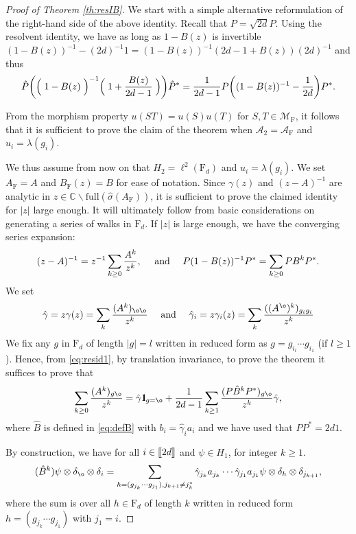 \documentclass[11pt]{article}
\renewcommand{\star}{{\mathrm{F}}}
\newcommand{\cA}{\mathcal{A}}
\newcommand{\dF}{\mathrm{F}}
\newcommand{\dC}{\mathbb {C}}
\newcommand{\cM}{\mathcal {M}}
\newcommand{\FULL}{ \mathrm{full}}
\newcommand{\PAR}[1]{{{\left(#1\right)}}} %
\newcommand{\1}{1\!\!{\sf I}}
\newcommand{\IND}{\1}
\newcommand{\INT}[1]{{{\left[\hspace{-1.4pt}\left[#1\right]\hspace{-1.4pt}\right]}}}
\begin{document}
\begin{proof}[Proof of Theorem \ref{th:resIB}]
We start with a simple alternative reformulation of the right-hand side of the above identity. Recall that $P = \sqrt {2d} \hat P$.  Using the resolvent identity, we have as long as $1 -B(z)$ is invertible
$(1 -B(z) )^{-1}  - (2d)^{-1} 1 = (1 - B(z) )^{-1} ( 2d - 1 + B(z) ) (2d)^{-1}$ and thus
\begin{equation}\label{eq:resid1}
\hat P \PAR{ \Bigm(1 - B(z) \Bigm)^{-1} \Bigm(  1 + \frac{B(z)}{2d-1} \Bigm) }  \hat P^*   = \frac{1}{2d-1} P \PAR{ (1 - B(z) )^{-1} - \frac{1}{2d}  }  P^*.
\end{equation}


From the morphism property $u ( S T) = u(S) u(T)$ for $S, T \in \cM_\star$, it follows that it is sufficient to prove the claim of the theorem when $\cA_2 = \cA_\star$ and $u_i = \lambda(g_i)$.

We thus assume from now on that $H_2 = \ell^2 (\dF_d)$ and $u_i = \lambda(g_i)$. We set $A_\star = A$ and $B_\star (z)= B$ for ease of notation. Since $\gamma(z)$ and $(z- A)^{-1}$ are analytic in $z \in \dC \backslash \FULL(\hat \sigma(A_\star))$, it is sufficient to prove the claimed identity for $|z|$ large enough. It will ultimately follow from basic considerations on generating a series of walks in $\dF_d$. If $|z|$ is large enough,  we have the converging series expansion:
$$
(z - A) ^{-1} = z^{-1} \sum_{k\geq 0} \frac{A^k}{z^k}, \quad  \hbox{ and } \quad   P(1 - B(z)) ^{-1} P^* =   \sum_{k \geq 0} P B^k P^*.
$$
We set  $$\hat \gamma = z \gamma(z) = \sum_k \frac{(A^k)_{\o \o}}{z^k} \quad  \hbox{ and } \quad  \hat \gamma_i  =  z \gamma_i (z) =   \sum_k \frac{((A^{\o})^k)_{g_i g_i}}{z^k} $$  
We fix any $g$ in $\dF_d$ of length $|g| = l$ written in reduced form as  $g= g_{i_l} \cdots g_{i_1}$ (if $l \geq 1$). Hence, from \eqref{eq:resid1}, by translation invariance, to prove the theorem it suffices to prove that 
\begin{equation}\label{eq:formula1}
\sum_{k\geq 0} \frac{(A^k)_{ g \o} }{z^k} = \hat \gamma \IND_{g = \o} + \frac{1}{2d-1}\sum_{k\geq 1}  \frac{(P \hat B^k P^*) _{g \o}}{z^k}  \hat \gamma,
\end{equation}
where $\hat B$ is defined in \eqref{eq:defB} with $b_i = \hat \gamma_i a_i$ and we have used that  $PP^* = 2d 1$. 

By construction, we have for all $i \in \INT{2d}$ and $\psi \in H_1$, for integer $k \geq 1$.
\begin{equation}\label{eq:Bkdeta0}
(\hat B^k ) \psi \otimes \delta_{\o} \otimes \delta_i = \sum_{h = (g_{j_{k}}\cdots g_{j_1}), j_{k+1} \ne j_k^*} \hat \gamma_{j_k} a_{j_k} \cdots \hat \gamma_{j_1} a_{j_1}\psi \otimes \delta_{h} \otimes \delta_{j_{k+1}}, 
\end{equation}
where the sum is over all $h \in \dF_d$ of length $k$ written in reduced form $h = (g_{j_{k}}\cdots g_{j_1})$ with $j_1 = i$.


\end{proof}
\end{document}
